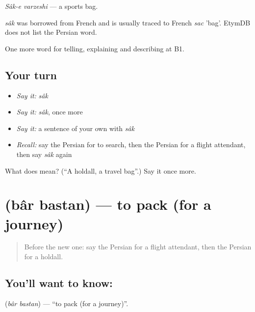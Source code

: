 \emph{Sâk-e varzeshi} — a sports bag.

\begin{cousinweb}
\emph{sâk} was borrowed from French and is usually traced to French \emph{sac} 'bag'. EtymDB does not list the Persian word.
\end{cousinweb}

\begin{grammarlens}[title={What you've built}]
One more word for telling, explaining and describing at B1.
\end{grammarlens}

\subsection*{Your turn}
\begin{itemize}
\raggedright
  \item \emph{Say it:} \emph{sâk}
  \item \emph{Say it:} \emph{sâk}, once more
  \item \emph{Say it:} a sentence of your own with \emph{sâk}
  \item \emph{Recall:} say the Persian for to search, then the Persian for a flight attendant, then say \emph{sâk} again
\end{itemize}

\begin{tcolorbox}[breakable,colback=teal!4,colframe=teal!35!black,title={Before you move on}]
What does  mean? (\textquotedblleft{}A holdall, a travel bag\textquotedblright{}.) Say it once more.
\end{tcolorbox}
\section[\texorpdfstring{\fa{بار} \fa{بستن} (bâr bastan)}{بار بستن (bâr bastan)}]{  (bâr bastan) — to pack (for a journey)}

\label{lesson:FA-C433-bar-bastan}



\begin{quote}
Before the new one: say the Persian for a flight attendant, then the Persian for a holdall.
\end{quote}

\subsection*{You'll want to know:  }
\textbf{ } (\emph{bâr bastan}) — \textquotedblleft{}to pack (for a journey)\textquotedblright{}.

